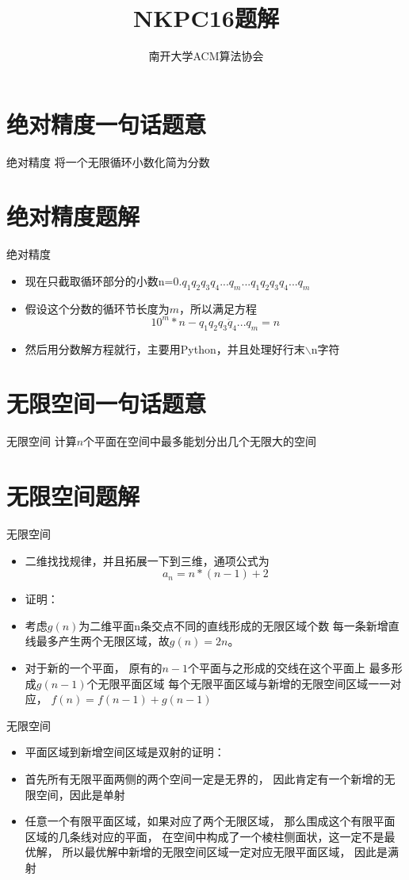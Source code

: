 \documentclass{beamer}
\author{南开大学ACM算法协会}
\begin{document}
\title{NKPC16题解} 
\frame{\titlepage}
\section{绝对精度一句话题意}
\begin{frame} {绝对精度}
  将一个无限循环小数化简为分数
\end{frame}
\section{绝对精度题解}
\begin{frame} {绝对精度}
\begin{itemize}
  \item 现在只截取循环部分的小数n=$0.q_1q_2q_3q_4...q_m...q_1q_2q_3q_4...q_m$
  \item 假设这个分数的循环节长度为$m$，所以满足方程
  $$
  10^m*n-\overline{q_1q_2q_3q_4...q_m}=n
  $$
  \item 然后用分数解方程就行，主要用Python，并且处理好行末$\backslash$n字符
\end{itemize}
\end{frame}


\section{无限空间一句话题意}
\begin{frame} {无限空间}
  计算$n$个平面在空间中最多能划分出几个无限大的空间
\end{frame}
\section{无限空间题解}
\begin{frame} {无限空间}
\begin{itemize}
  \item 二维找找规律，并且拓展一下到三维，通项公式为$$a_n=n*(n-1)+2$$
  \item 证明：
  \item 考虑$g(n)$为二维平面n条交点不同的直线形成的无限区域个数
  每一条新增直线最多产生两个无限区域，故$g(n)=2n$。
  \item 对于新的一个平面，
  原有的$n-1$个平面与之形成的交线在这个平面上
  最多形成$g(n-1)$个无限平面区域
  每个无限平面区域与新增的无限空间区域一一对应，
  $f(n)=f(n-1)+g(n-1)$
\end{itemize}
\end{frame}

\begin{frame} {无限空间}
  \begin{itemize}
    \item 平面区域到新增空间区域是双射的证明：
    \item 首先所有无限平面两侧的两个空间一定是无界的，
    因此肯定有一个新增的无限空间，因此是单射
    \item 任意一个有限平面区域，如果对应了两个无限区域，
    那么围成这个有限平面区域的几条线对应的平面，
    在空间中构成了一个棱柱侧面状，这一定不是最优解，
    所以最优解中新增的无限空间区域一定对应无限平面区域，
    因此是满射
  \end{itemize}
  \end{frame}
\end{document}
